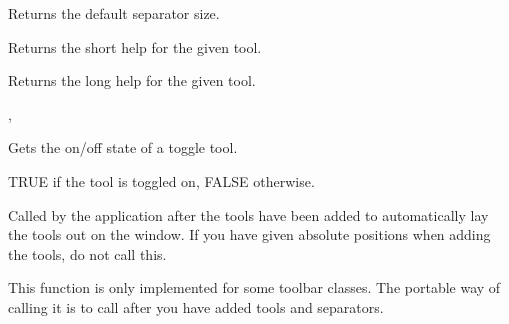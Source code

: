 
\label{wxtoolbargettoolseparation}


Returns the default separator size.



\label{wxtoolbargettoolshorthelp}


Returns the short help for the given tool.

Returns the long help for the given tool.




,\rtfsp
{}\rtfsp

\label{wxtoolbargettoolstate}


Gets the on/off state of a toggle tool.




TRUE if the tool is toggled on, FALSE otherwise.

%
%
\label{wxtoolbarlayout}


Called by the application after the tools have been added to
automatically lay the tools out on the window. If you have given
absolute positions when adding the tools, do not call this.

This function is only implemented for some toolbar classes.
The portable way of calling it is to call  after
you have added tools and separators.

